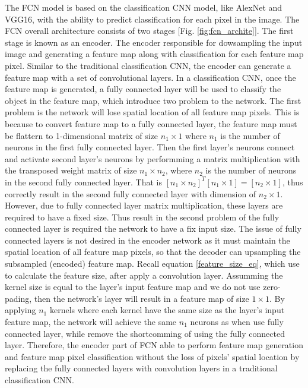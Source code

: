 The FCN model is based on the classification CNN model, like AlexNet and VGG16, with the ability to predict classification for each pixel in the image. The FCN overall architecture consists of two stages [Fig. \ref{fig:fcn_archite}]. The first stage is known as an encoder. The encoder responsible for dowsampling the input image and generating a feature map along with classification for each feature map pixel. Similar to the traditional classification CNN, the encoder can generate a feature map with a set of convolutional layers. In a classification CNN, once the feature map is generated, a fully connected layer will be used to classify the object in the feature map, which introduce two problem to the network. The first problem is the network will lose spatial location of all feature map pixels. This is because to convert feature map to a fully connected layer, the feature map must be flattern to 1-dimensional matrix of size $n_1 \times 1$ where $n_1$ is the number of neurons in the first fully connected layer. Then the first layer's neurons connect and activate second layer's neurons by performming a matrix multiplication with the transposed weight matrix of size $n_1 \times n_2$, where $n_2$ is the number of neurons in the second fully connected layer. That is $[n_1 \times n_2]^T [n_1 \times 1] = [n_2 \times 1]$, thus correctly result in the second fully connected layer with dimension of $n_2 \times 1$. However, due to fully connected layer matrix multiplication, these layers are required to have a fixed size. Thus result in the second problem of the fully connected layer is required the network to have a fix input size. The issue of fully connected layers is not desired in the encoder network as it must maintain the spatial location of all feature map pixels, so that the decoder can upsampling the subsampled (encoded) feature map. Recall equation \ref{feature_size_eq}, which use to calculate the feature size, after apply a convolution layer. Assumming the kernel size is equal to the layer's input feature map and we do not use zero-pading, then the network's layer will result in a feature map of size $1 \times 1$. By applying $n_1$ kernels where each kernel have the same size as the layer's input feature map, the network will achieve the same $n_1$ neurons as when use fully connected layer, while remove the shortcomming of using the fully connected layer. Therefore, the encoder part of FCN able to perform feature map generation and feature map pixel classification without the loss of pixels' spatial location by replacing the fully connected layers with convolution layers in a traditional classification CNN.

